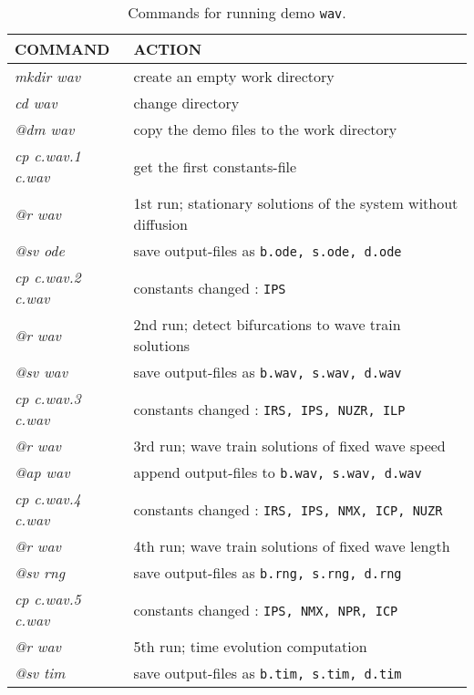 \documentclass[12pt]{report}
\begin{document}
\begin{table}[htbp]
\begin{center}
\begin{tabular}{| l | l |}
\hline
  COMMAND  & ACTION \\
\hline
  {\it mkdir wav} & create an empty work directory \\ 
  {\it cd wav} & change directory \\
  {\it @dm wav} & copy the demo files to the work directory \\
\hline
  {\it cp c.wav.1 c.wav} & get the first constants-file \\ 
  {\it @r wav} & 1st run; stationary solutions of the system without diffusion \\ 
  {\it @sv ode} & save output-files as {\tt b.ode, s.ode, d.ode} \\ 
\hline
  {\it cp c.wav.2 c.wav} & constants changed : {\tt IPS} \\ 
  {\it @r wav} & 2nd run; detect bifurcations to wave train solutions \\ 
  {\it @sv wav} & save output-files as {\tt b.wav, s.wav, d.wav} \\ 
\hline
  {\it cp c.wav.3 c.wav} & constants changed : {\tt IRS, IPS, NUZR, ILP} \\ 
  {\it @r wav} & 3rd run; wave train solutions of fixed wave speed \\ 
  {\it @ap wav} & append output-files to {\tt b.wav, s.wav, d.wav} \\ 
\hline
  {\it cp c.wav.4 c.wav} & constants changed : {\tt IRS, IPS, NMX, ICP, NUZR} \\ 
  {\it @r wav} & 4th run; wave train solutions of fixed wave length \\ 
  {\it @sv rng} & save output-files as {\tt b.rng, s.rng, d.rng} \\ 
\hline
  {\it cp c.wav.5 c.wav} & constants changed : {\tt IPS, NMX, NPR, ICP} \\ 
  {\it @r wav} & 5th run; time evolution computation \\ 
  {\it @sv tim} & save output-files as {\tt b.tim, s.tim, d.tim} \\ 
\hline
\end{tabular}
\caption{Commands for running demo {\tt wav}.}
\label{tbl:demo_wav}
\end{center}
\end{table}
\end{document}
